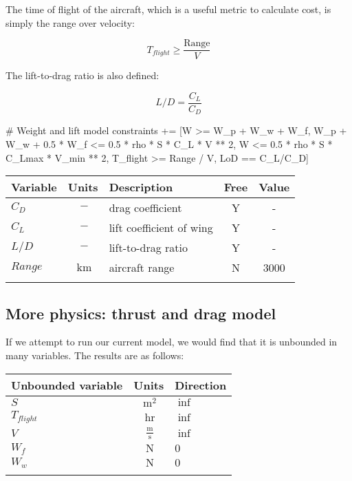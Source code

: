 The time of flight of the aircraft, which is a useful metric to calculate cost, is simply the range over velocity:

\begin{equation}
    T_{flight} \geq \frac{\mathrm{Range}}{V}
\end{equation}

The lift-to-drag ratio is also defined: 

\begin{equation}
    L/D = \frac{C_L}{C_D}    
\end{equation}

\begin{python}
        # Weight and lift model
        constraints += [W >= W_p + W_w + W_f,
                W_p + W_w + 0.5 * W_f <=
                        0.5 * rho * S * C_L * V ** 2,
                W <= 0.5 * rho * S * C_Lmax * V_min ** 2,
                T_flight >= Range / V,
                LoD == C_L/C_D]
\end{python}

\footnotesize
\centering
\begin{tabular}{ l c l c c }
    \toprule
	Variable & Units & Description & Free & Value \\
    \midrule
    $C_D$ & $~\mathrm{-}$ & drag coefficient & Y & - \\
    $C_L$ & $~\mathrm{-}$ & lift coefficient of wing & Y & - \\
    $L/D$ & $~\mathrm{-}$ & lift-to-drag ratio & Y & - \\
    $Range$ & $~\mathrm{km}$ & aircraft range & N & 3000 \\
    \bottomrule
\label{tab:vars_perfMetrics}
\end{tabular}

\subsection{More physics: thrust and drag model}

If we attempt to run our current model, we would find that it is unbounded in many variables.
The results are as follows:

\footnotesize
\begin{tabular}{ l c l }
    \toprule
	Unbounded variable & Units & Direction \\
    \midrule
    $S$ & $~\mathrm{m^{2}}$ & $\inf$ \\
    $T_{flight}$ & $~\mathrm{hr}$ & $\inf$ \\
    $V$ &  $~\mathrm{\tfrac{m}{s}}$  & $\inf$ \\
    $W_f$ & $~\mathrm{N}$ & $0$ \\
    $W_w$ & $~\mathrm{N}$  & $0$ \\
    \bottomrule
\label{tab:WandL_unbounded}
\end{tabular}

